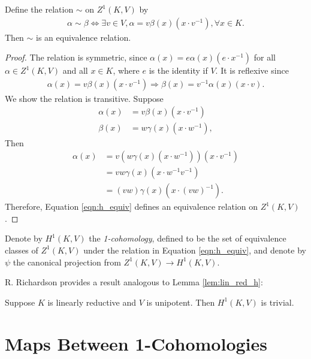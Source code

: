 \begin{lemma} Define the relation $\sim$ on $Z^1(K, V)$ by
	\begin{align}
		\alpha \sim \beta \Leftrightarrow \exists v \in V, \alpha = v\beta(x)(x \cdot v^{-1}), \forall x \in K.
		\label{eqn:h_equiv}
	\end{align}
Then $\sim$ is an equivalence relation.
\end{lemma}
\begin{proof}
The relation is symmetric, since $\alpha(x) = e\alpha(x)(e \cdot x^{-1})$ for all $\alpha\in Z^1(K, V)$ and all $x \in K$, where $e$ is the identity if $V$. It is reflexive since
\begin{align*}
	\alpha(x) = v \beta(x)(x \cdot v^{-1}) \Rightarrow \beta(x) = v^{-1}\alpha(x)(x\cdot v).
\end{align*}
We show the relation is transitive. Suppose
\begin{align*}
	\alpha(x) &= v\beta(x)(x\cdot v^{-1}) \\
	\beta(x) &= w\gamma(x)(x\cdot w^{-1}),
\end{align*}
Then
\begin{align*}
	\alpha(x) &= v\left(w \gamma(x)(x\cdot w^{-1})\right)\left(x\cdot v^{-1}\right) \\
		&= vw \gamma(x)\left(x\cdot w^{-1}v^{-1}\right) \\
		&= (vw) \gamma(x)\left(x\cdot (vw)^{-1}\right).
\end{align*}
Therefore, Equation \ref{eqn:h_equiv} defines an equivalence relation on $Z^1(K, V)$.
\end{proof}

\begin{definition}
Denote by $H^1(K, V)$ the \emph{1-cohomology}, defined to be the set of equivalence classes of $Z^1(K, V)$ under the relation in Equation \ref{eqn:h_equiv}, and denote by $\psi$ the canonical projection from $Z^1(K, V) \rightarrow H^1(K, V)$.
\end{definition}

R. Richardson \cite[Lemma 6.2.6]{richardson1982orbits} provides a result analogous to Lemma \ref{lem:lin_red_h}:
\begin{lemma}
  Suppose $K$ is linearly reductive and $V$ is unipotent. Then $H^1(K, V)$ is trivial.
  \label{lem:nonab_lin_red}
\end{lemma}

\section{Maps Between 1-Cohomologies}

